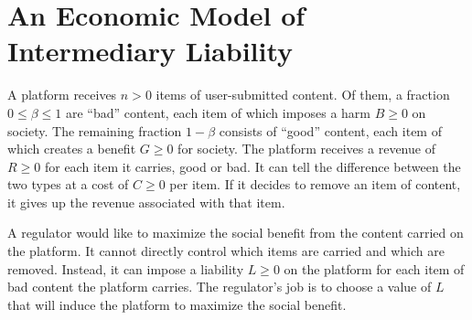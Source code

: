 

\section{An Economic Model of Intermediary Liability}

A platform receives $n > 0$ items of user-submitted content. Of them, a fraction $0 \le \beta \le 1$  are ``bad'' content, each item of which imposes a harm $B \ge 0$ on society. The remaining fraction $1 - \beta$ consists of ``good'' content, each item of which creates a benefit $G \ge 0$ for society. The platform receives a revenue of $R \ge 0$ for each item it carries, good or bad. It can tell the difference between the two types at a cost of $C \ge 0$ per item. If it decides to remove an item of content, it gives up the revenue associated with that item.

A regulator would like to maximize the social benefit from the content carried on the platform. It cannot directly control which items are carried and which are removed. Instead, it can impose a liability $L \ge 0$ on the platform for each item of bad content the platform carries. The regulator's job is to choose a value of $L$ that will induce the platform to maximize the social benefit.

